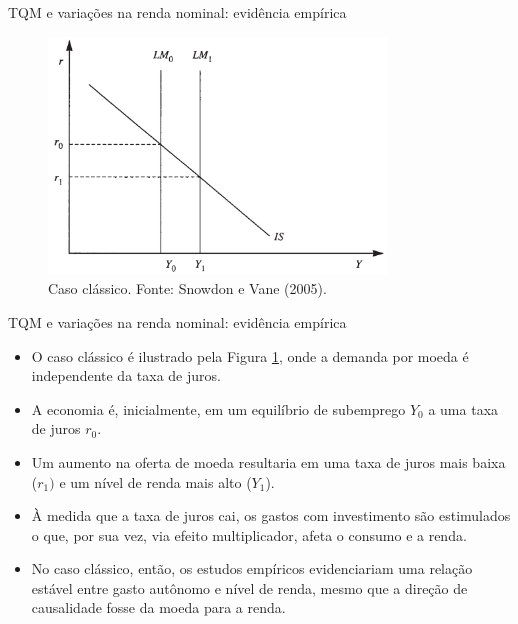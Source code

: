 \documentclass[10pt]{beamer}
\begin{document}
\begin{frame}{TQM e variações na renda nominal: evidência empírica}
    \begin{figure}
        \centering
        \includegraphics[width=0.8\textwidth]{./figures/aula10_fig6.PNG}
        \caption{Caso clássico. Fonte: Snowdon e Vane (2005).}
        \label{fig6}
    \end{figure}
\end{frame}

\begin{frame}{TQM e variações na renda nominal: evidência empírica}
    \begin{itemize}
        \item O caso clássico é ilustrado pela Figura \ref{fig6}, onde a demanda por moeda é independente da taxa de juros.
        \bigskip
        \item A economia é, inicialmente, em um equilíbrio de subemprego $Y_0$ a uma taxa de juros $r_0$.
        \bigskip
        \item Um aumento na oferta de moeda resultaria em uma taxa de juros mais baixa ($r_1)$ e um nível de renda mais alto ($Y_1$).
        \bigskip
        \item À medida que a taxa de juros cai, os gastos com investimento são estimulados o que, por sua vez, via efeito multiplicador, afeta o consumo e a renda.
        \bigskip
        \item No caso clássico, então, os estudos empíricos evidenciariam uma relação estável entre gasto autônomo e nível de renda, mesmo que a direção de causalidade fosse da moeda para a renda.
    \end{itemize}
\end{frame}
\end{document}
